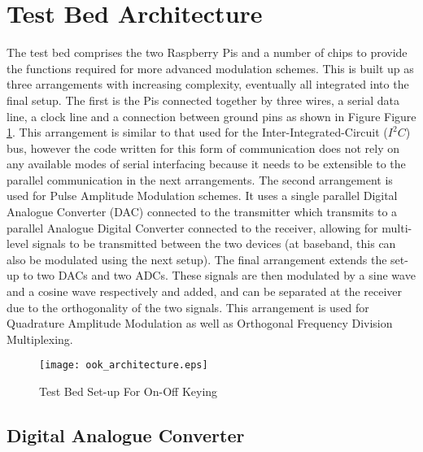 \documentclass[../main.tex]{subfiles}
\begin{document}
	
\section{Test Bed Architecture}

The test bed comprises the two Raspberry Pis and a number of chips to provide the functions required for more advanced modulation schemes.
This is built up as three arrangements with increasing complexity, eventually all integrated into the final setup.
The first is the Pis connected together by three wires, a serial data line, a clock line and a connection between ground pins as shown in Figure Figure \ref{fig_OOK Architecture}.
This arrangement is similar to that used for the Inter-Integrated-Circuit ($I^2C$) bus, however the code written for this form of communication does not rely on any available modes of serial interfacing because it needs to be extensible to the parallel communication in the next arrangements.
The second arrangement is used for Pulse Amplitude Modulation schemes.
It uses a single parallel Digital Analogue Converter (DAC) connected to the transmitter which transmits to a parallel Analogue Digital Converter connected to the receiver, allowing for multi-level signals to be transmitted between the two devices (at baseband, this can also be modulated using the next setup).
The final arrangement extends the set-up to two DACs and two ADCs.
These signals are then modulated by a sine wave and a cosine wave respectively and added, and can be separated at the receiver due to the orthogonality of the two signals.
This arrangement is used for Quadrature Amplitude Modulation as well as Orthogonal Frequency Division Multiplexing.\\

\begin{figure}[ht]
	\centering
	\texttt{[image: ook\_architecture.eps]}
	\caption{Test Bed Set-up For On-Off Keying}
	\label{fig_OOK Architecture}
\end{figure}

\subsection{Digital Analogue Converter}
\end{document}
